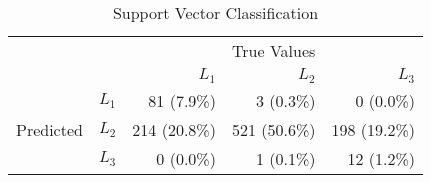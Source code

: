 \begin{table}
\centering
  \caption{Support Vector Classification}
  \begin{tabular}{rrrrr}
    \toprule
    & &\multicolumn{3}{c}{True Values}\\
    & & ${L_1}$ & ${L_2}$ & ${L_3}$ \\
    \multirow{3}{*}{Predicted} & ${L_1}$ & 81 (7.9\%) & 3 (0.3\%) & 0 (0.0\%) \\
    & ${L_2}$ & 214 (20.8\%) & 521 (50.6\%) & 198 (19.2\%) \\
    & ${L_3}$ & 0 (0.0\%) & 1 (0.1\%) & 12 (1.2\%) \\\bottomrule
  \end{tabular}
\end{table}
